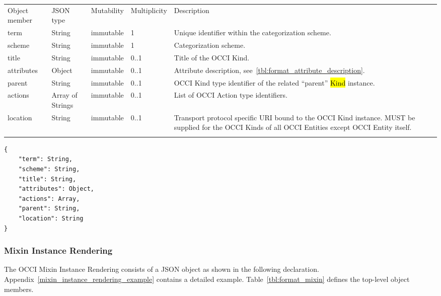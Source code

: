\documentclass[10pt,a4paper]{article}
\begin{document}
 {
    \begin{tabularx}{\textwidth}{llllX}
    \toprule
    Object member   & JSON type         & Mutability  & Multiplicity  & Description \\
    \colrule
    term            & String            & immutable   & 1             & Unique identifier within the categorization scheme. \\

    scheme          & String            & immutable   & 1             & Categorization scheme. \\

    title           & String            & immutable   & 0..1          & Title of the OCCI Kind. \\

    attributes      & Object            & immutable   & 0..1          & Attribute description, see~\ref{tbl:format_attribute_description}. \\

    parent          & String            & immutable   & 0..1          & OCCI Kind type identifier of the related ``parent'' \hl{Kind} instance. \\

    actions         & Array of Strings  & immutable   & 0..1          & List of OCCI Action type identifiers. \\

    location        & String            & immutable   & 0..1          & Transport protocol specific URI bound to the OCCI Kind instance. MUST be supplied for the OCCI Kinds of all OCCI Entities except OCCI Entity itself. \\
    \botrule
    \end{tabularx}
}

\begin{lstlisting}
{
    "term": String,
    "scheme": String,
    "title": String,
    "attributes": Object,
    "actions": Array,
    "parent": String,
    "location": String
}
\end{lstlisting}

\subsubsection{Mixin Instance Rendering}
\label{sec:format_mixin}

The OCCI Mixin Instance Rendering consists of a JSON object as shown in the following
declaration. Appendix~\ref{mixin_instance_rendering_example} contains a detailed example.
Table~\ref{tbl:format_mixin} defines the top-level object members.
\end{document}
